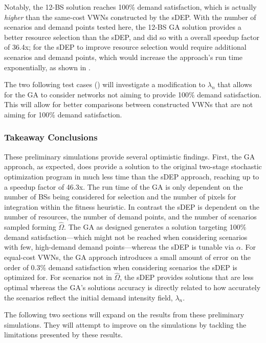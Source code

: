\documentclass[12pt,dvipsnames]{report}
\begin{document}
Notably, the 12-BS solution reaches 100\% demand satisfaction, which is actually \emph{higher} than the same-cost VWNs constructed by the sDEP.  With the number of scenarios and demand points tested here, the 12-BS GA solution provides a better resource selection than the sDEP, and did so with a overall speedup factor of 36.4x; for the sDEP to improve resource selection would require additional scenarios and demand points, which would increase the approach's run time exponentially, as shown in .

The two following test cases () will investigate a modification to $\lambda_n$ that allows for the GA to consider networks not aiming to provide 100\% demand satisfaction.  This will allow for better comparisons between constructed VWNs that are not aiming for 100\% demand satisfaction.

\subsubsection{Takeaway Conclusions}

These preliminary simulations provide several optimistic findings.  First, the GA approach, as expected, does provide a solution to the original two-stage stochastic optimization program in much less time than the sDEP approach, reaching up to a speedup factor of 46.3x.  The run time of the GA is only dependent on the number of BSs being considered for selection and the number of pixels for integration within the fitness heuristic.  In contrast the sDEP is dependent on the number of resources, the number of demand points, and the number of scenarios sampled forming $\hat{\Omega}$.  The GA as designed generates a solution targeting 100\% demand satisfaction---which might not be reached when considering scenarios with few, high-demand demand points---whereas the sDEP is tunable via $\alpha$.  For equal-cost VWNs, the GA approach introduces a small amount of error on the order of 0.3\% demand satisfaction when considering scenarios the sDEP is optimized for.  For scenarios not in $\hat{\Omega}$, the sDEP provides solutions that are less optimal whereas the GA's solutions accuracy is directly related to how accurately the scenarios reflect the initial demand intensity field, $\lambda_n$.

The following two sections will expand on the results from these preliminary simulations.  They will attempt to improve on the simulations by tackling the limitations presented by these results.
\end{document}
